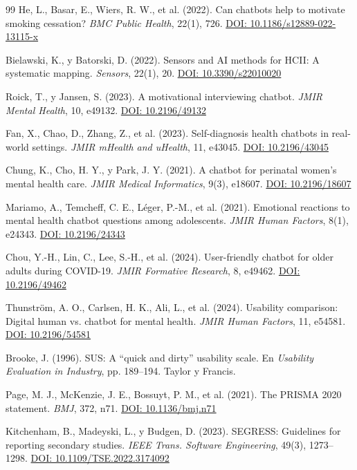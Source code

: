 \documentclass[11pt,twocolumn]{article}
\begin{document}
\begin{thebibliography}{99}
He, L., Basar, E., Wiers, R. W., et al. (2022). Can chatbots help to motivate smoking cessation? \textit{BMC Public Health}, 22(1), 726. \href{https://doi.org/10.1186/s12889-022-13115-x}{DOI: 10.1186/s12889-022-13115-x}

Bielawski, K., y Batorski, D. (2022). Sensors and AI methods for HCII: A systematic mapping. \textit{Sensors}, 22(1), 20. \href{https://doi.org/10.3390/s22010020}{DOI: 10.3390/s22010020}

Roick, T., y Jansen, S. (2023). A motivational interviewing chatbot. \textit{JMIR Mental Health}, 10, e49132. \href{https://doi.org/10.2196/49132}{DOI: 10.2196/49132}

Fan, X., Chao, D., Zhang, Z., et al. (2023). Self-diagnosis health chatbots in real-world settings. \textit{JMIR mHealth and uHealth}, 11, e43045. \href{https://doi.org/10.2196/43045}{DOI: 10.2196/43045}

Chung, K., Cho, H. Y., y Park, J. Y. (2021). A chatbot for perinatal women's mental health care. \textit{JMIR Medical Informatics}, 9(3), e18607. \href{https://doi.org/10.2196/18607}{DOI: 10.2196/18607}

Mariamo, A., Temcheff, C. E., Léger, P.-M., et al. (2021). Emotional reactions to mental health chatbot questions among adolescents. \textit{JMIR Human Factors}, 8(1), e24343. \href{https://doi.org/10.2196/24343}{DOI: 10.2196/24343}

Chou, Y.-H., Lin, C., Lee, S.-H., et al. (2024). User-friendly chatbot for older adults during COVID-19. \textit{JMIR Formative Research}, 8, e49462. \href{https://doi.org/10.2196/49462}{DOI: 10.2196/49462}

Thunström, A. O., Carlsen, H. K., Ali, L., et al. (2024). Usability comparison: Digital human vs. chatbot for mental health. \textit{JMIR Human Factors}, 11, e54581. \href{https://doi.org/10.2196/54581}{DOI: 10.2196/54581}

Brooke, J. (1996). SUS: A ``quick and dirty'' usability scale. En \textit{Usability Evaluation in Industry}, pp. 189--194. Taylor y Francis.

Page, M. J., McKenzie, J. E., Bossuyt, P. M., et al. (2021). The PRISMA 2020 statement. \textit{BMJ}, 372, n71. \href{https://doi.org/10.1136/bmj.n71}{DOI: 10.1136/bmj.n71}

Kitchenham, B., Madeyski, L., y Budgen, D. (2023). SEGRESS: Guidelines for reporting secondary studies. \textit{IEEE Trans. Software Engineering}, 49(3), 1273--1298. \href{https://doi.org/10.1109/TSE.2022.3174092}{DOI: 10.1109/TSE.2022.3174092}

\end{thebibliography}
\end{document}
